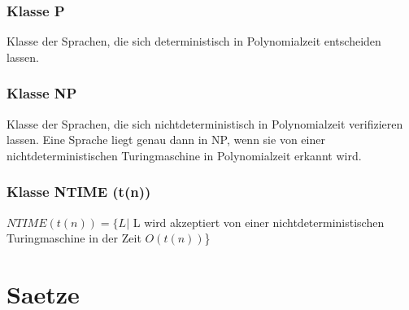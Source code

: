 \documentclass[a4paper]{scrreprt}
\begin{document}
\subsubsection{Klasse P} Klasse der Sprachen, die sich deterministisch in Polynomialzeit entscheiden lassen.
\subsubsection{Klasse NP} Klasse der Sprachen, die sich nichtdeterministisch in Polynomialzeit verifizieren lassen. Eine Sprache liegt genau dann in NP, wenn sie von einer nichtdeterministischen Turingmaschine in Polynomialzeit erkannt wird.
\subsubsection{Klasse NTIME (t(n))} $NTIME (t(n)) = \{L|$ L wird akzeptiert von einer nichtdeterministischen Turingmaschine in der Zeit $O(t(n))$\}



\section{Saetze}
\end{document}
